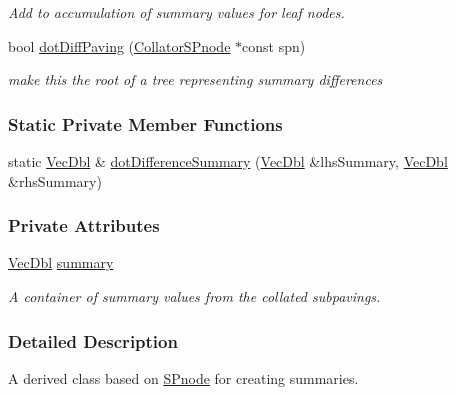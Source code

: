 \begin{DoxyCompactItemize}
\begin{DoxyCompactList}\small\item\em \-Add to accumulation of summary values for leaf nodes. \end{DoxyCompactList}\item 
bool \hyperlink{classsubpavings_1_1CollatorSPnode_a66a1a3e5a8c9c81e4f3b307360c2c495}{dot\-Diff\-Paving} (\hyperlink{classsubpavings_1_1CollatorSPnode}{\-Collator\-S\-Pnode} $\ast$const spn)
\begin{DoxyCompactList}\small\item\em make this the root of a tree representing summary differences \end{DoxyCompactList}\end{DoxyCompactItemize}
\subsubsection*{\-Static \-Private \-Member \-Functions}
\begin{DoxyCompactItemize}
\item 
static \hyperlink{namespacesubpavings_a6b4d2e61b2f0b65cacc9c9322d89bc37}{\-Vec\-Dbl} \& \hyperlink{classsubpavings_1_1CollatorSPnode_a3a0733086ac4a95e954da0cd8f0e1dfa}{dot\-Difference\-Summary} (\hyperlink{namespacesubpavings_a6b4d2e61b2f0b65cacc9c9322d89bc37}{\-Vec\-Dbl} \&lhs\-Summary, \hyperlink{namespacesubpavings_a6b4d2e61b2f0b65cacc9c9322d89bc37}{\-Vec\-Dbl} \&rhs\-Summary)
\end{DoxyCompactItemize}
\subsubsection*{\-Private \-Attributes}
\begin{DoxyCompactItemize}
\item 
\hyperlink{namespacesubpavings_a6b4d2e61b2f0b65cacc9c9322d89bc37}{\-Vec\-Dbl} \hyperlink{classsubpavings_1_1CollatorSPnode_abecd2f87f50d84f2c3d04e6b0b15a5ec}{summary}
\begin{DoxyCompactList}\small\item\em \-A container of summary values from the collated subpavings. \end{DoxyCompactList}\end{DoxyCompactItemize}


\subsubsection{\-Detailed \-Description}
\-A derived class based on \hyperlink{classsubpavings_1_1SPnode}{\-S\-Pnode} for creating summaries. 

